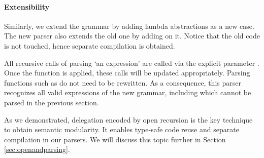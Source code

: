 
%
%

\paragraph{Extensibility} Similarly, we extend the grammar by adding lambda abstractions as a new case. The new parser also extends the old one by adding  on it. Notice that the old code is not touched, hence separate compilation is obtained.



All recursive calls of parsing `an expression' are called via the explicit parameter . Once the  function is applied, these calls will be updated appropriately. Parsing functions such as  do not need to be rewritten. As a consequence, this parser recognizes all valid expressions of the new grammar, including   which cannot be parsed in the previous section.


As we demonstrated, delegation encoded by open recursion is the key technique to obtain semantic modularity. It enables type-safe code reuse and separate compilation in our parsers. We will discuss this topic further in Section \ref{sec:openandparsing}.

